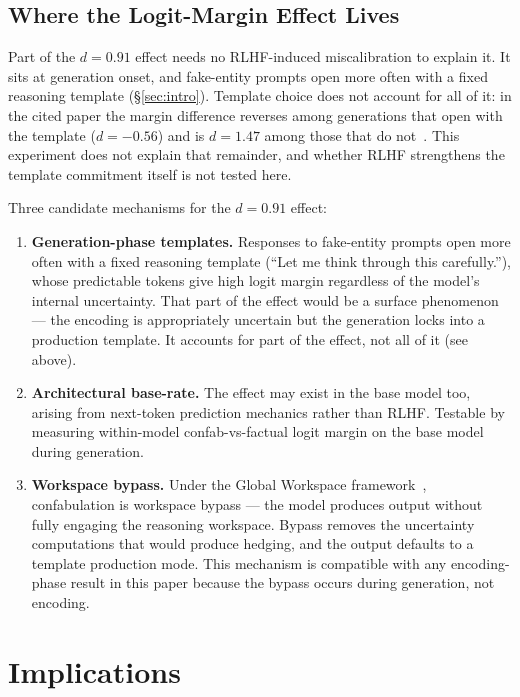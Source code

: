 \documentclass[11pt,a4paper]{article}
\begin{document}
\subsection{Where the Logit-Margin Effect Lives}

Part of the $d{=}0.91$ effect needs no RLHF-induced miscalibration to
explain it. It sits at generation onset, and fake-entity prompts open
more often with a fixed reasoning template (\S\ref{sec:intro}). Template
choice does not account for all of it: in the cited paper the margin
difference reverses among generations that open with the template
($d{=}{-}0.56$) and is $d{=}1.47$ among those that do
not~\citep{lyra2026decision}. This experiment does not explain that
remainder, and whether RLHF strengthens the template commitment itself
is not tested here.

Three candidate mechanisms for the $d{=}0.91$ effect:

\begin{enumerate}[nosep]
\item \textbf{Generation-phase templates.} Responses to fake-entity
  prompts open more often with a fixed reasoning template (``Let me
  think through this carefully.''), whose predictable tokens give high
  logit margin regardless of the model's internal uncertainty. That
  part of the effect would be a surface phenomenon --- the encoding is
  appropriately uncertain but the generation locks into a production
  template. It accounts for part of the effect, not all of it (see
  above).
\item \textbf{Architectural base-rate.} The effect may
  exist in the base model too, arising from next-token prediction
  mechanics rather than RLHF. Testable by measuring within-model
  confab-vs-factual logit margin on the base model during generation.
\item \textbf{Workspace bypass.} Under the Global Workspace
  framework~\citep{gurnee2026gwt}, confabulation is workspace
  bypass --- the model produces output without fully engaging the
  reasoning workspace. Bypass removes the uncertainty computations
  that would produce hedging, and the output defaults to a
  template production mode. This mechanism is compatible with
  any encoding-phase result in this paper because the bypass occurs
  during generation, not encoding.
\end{enumerate}

\section{Implications}
\label{sec:implications}
\end{document}
